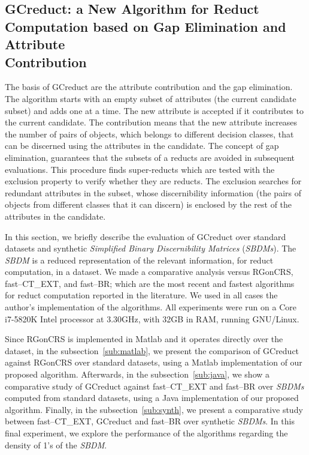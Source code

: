 \documentclass[authoryear,11pt]{elsarticle}
\begin{document}
\subsection{GCreduct: a New Algorithm for Reduct Computation based on Gap Elimination and Attribute\\ Contribution}\label{evaluation}
  
  The basis of GCreduct are the attribute contribution and the gap elimination. The algorithm starts with an empty subset of attributes (the current candidate subset) and adds one at a time. The new attribute is accepted if it contributes to the current candidate. The contribution means that the new attribute increases the number of pairs of objects, which belongs to different decision classes, that can be discerned using the attributes in the candidate. The concept of gap elimination, guarantees that the subsets of a reducts are avoided in subsequent evaluations. This procedure finds super-reducts which are tested with the exclusion property to verify whether they are reducts. The exclusion searches for redundant attributes in the subset, whose discernibility information (the pairs of objects from different classes that it can discern) is enclosed by the rest of the attributes in the candidate.

  In this section, we briefly describe the evaluation of GCreduct over standard datasets \citep{Bache13} and synthetic \textit{Simplified Binary Discernibility Matrices} (\textit{SBDMs}). The \textit{SBDM} is a reduced representation of the relevant information, for reduct computation, in a dataset. We made a comparative analysis versus RGonCRS, fast--CT\_EXT, and fast--BR; which are the most recent and fastest algorithms for reduct computation reported in the literature. We used in all cases the author's implementation of the algorithms. All experiments were run on a Core i7-5820K Intel processor at 3.30GHz, with 32GB in RAM, running GNU/Linux.

  Since RGonCRS is implemented in Matlab and it operates directly over the dataset, in the subsection~\ref{sub:matlab}, we present the comparison of  GCreduct against RGonCRS over standard datasets, using a Matlab implementation of our proposed algorithm. Afterwards, in the subsection~\ref{sub:java}, we show a comparative study of GCreduct against fast--CT\_EXT and fast--BR over \textit{SBDMs} computed from standard datasets, using a Java implementation of our proposed algorithm. Finally, in the subsection~\ref{sub:synth}, we present a comparative study between fast--CT\_EXT, GCreduct and fast--BR over synthetic \textit{SBDMs}. In this final experiment, we explore the performance of the algorithms regarding the density of 1's of the \textit{SBDM}.
\end{document}
